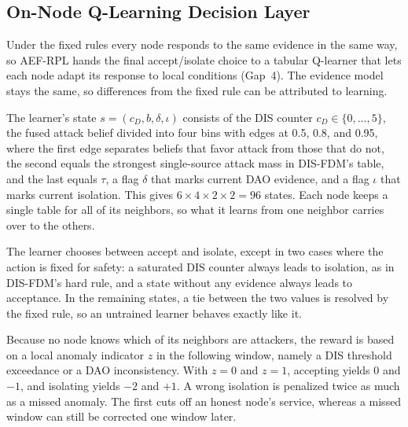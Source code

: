 \subsection{On-Node Q-Learning Decision Layer}
Under the fixed rules every node responds to the same evidence in the same way, so AEF-RPL hands the final accept/isolate choice to a tabular Q-learner \cite{watkins1992} that lets each node adapt its response to local conditions (Gap~4). The evidence model stays the same, so differences from the fixed rule can be attributed to learning.

The learner's state $s=(c_D,b,\delta,\iota)$ consists of the DIS counter $c_D\in\{0,\dots,5\}$, the fused attack belief divided into four bins with edges at 0.5, 0.8, and 0.95, where the first edge separates beliefs that favor attack from those that do not, the second equals the strongest single-source attack mass in DIS-FDM's table, and the last equals $\tau$, a flag $\delta$ that marks current DAO evidence, and a flag $\iota$ that marks current isolation. This gives $6\times4\times2\times2=96$ states. Each node keeps a single table for all of its neighbors, so what it learns from one neighbor carries over to the others.

The learner chooses between accept and isolate, except in two cases where the action is fixed for safety: a saturated DIS counter always leads to isolation, as in DIS-FDM's hard rule, and a state without any evidence always leads to acceptance. In the remaining states, a tie between the two values is resolved by the fixed rule, so an untrained learner behaves exactly like it.

Because no node knows which of its neighbors are attackers, the reward is based on a local anomaly indicator $z$ in the following window, namely a DIS threshold exceedance or a DAO inconsistency. With $z=0$ and $z=1$, accepting yields $0$ and $-1$, and isolating yields $-2$ and $+1$. A wrong isolation is penalized twice as much as a missed anomaly. The first cuts off an honest node's service, whereas a missed window can still be corrected one window later.

